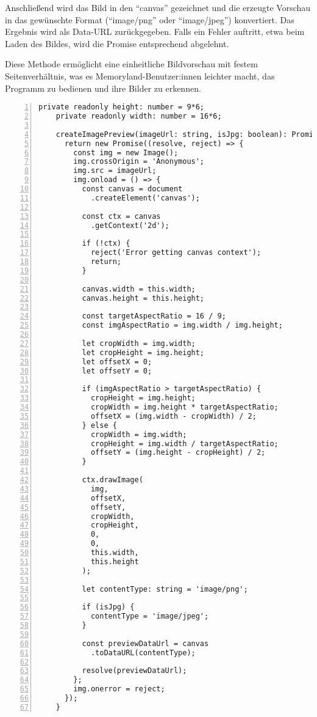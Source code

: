 Anschließend wird das Bild in den ``canvas'' gezeichnet und die erzeugte Vorschau in das gewünschte Format 
(``image/png'' oder ``image/jpeg'') konvertiert. Das Ergebnis wird als Data-URL zurückgegeben. Falls ein Fehler 
auftritt, etwa beim Laden des Bildes, wird die Promise entsprechend abgelehnt.

Diese Methode ermöglicht eine einheitliche Bildvorschau mit festem Seitenverhältnis, was es Memoryland-Benutzer:innen
leichter macht, das Programm zu bedienen und ihre Bilder zu erkennen.

\begin{lstlisting}[numbers=left,caption={Methode createImagePreview},label={lst:method-create-image-preview}]
    private readonly height: number = 9*6;
    private readonly width: number = 16*6;
  
    createImagePreview(imageUrl: string, isJpg: boolean): Promise<string> {
      return new Promise((resolve, reject) => {
        const img = new Image();
        img.crossOrigin = 'Anonymous';
        img.src = imageUrl;
        img.onload = () => {
          const canvas = document
            .createElement('canvas');
  
          const ctx = canvas
            .getContext('2d');
  
          if (!ctx) {
            reject('Error getting canvas context');
            return;
          }
  
          canvas.width = this.width;
          canvas.height = this.height;
  
          const targetAspectRatio = 16 / 9;
          const imgAspectRatio = img.width / img.height;
  
          let cropWidth = img.width;
          let cropHeight = img.height;
          let offsetX = 0;
          let offsetY = 0;
  
          if (imgAspectRatio > targetAspectRatio) {
            cropHeight = img.height;
            cropWidth = img.height * targetAspectRatio;
            offsetX = (img.width - cropWidth) / 2;
          } else {
            cropWidth = img.width;
            cropHeight = img.width / targetAspectRatio;
            offsetY = (img.height - cropHeight) / 2;
          }
  
          ctx.drawImage(
            img,
            offsetX,
            offsetY,
            cropWidth,
            cropHeight,
            0,
            0,
            this.width,
            this.height
          );
  
          let contentType: string = 'image/png';
  
          if (isJpg) {
            contentType = 'image/jpeg';
          }
  
          const previewDataUrl = canvas
            .toDataURL(contentType);
  
          resolve(previewDataUrl);
        };
        img.onerror = reject;
      });
    }
\end{lstlisting}

